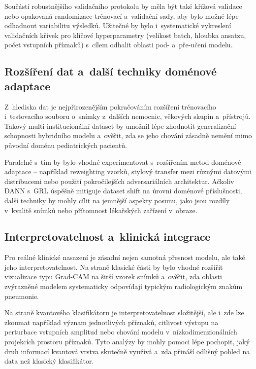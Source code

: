 \documentclass[12pt, a4paper]{report}
\begin{document}
Součástí robustnějšího validačního protokolu by měla být také křížová validace nebo opakovaná randomizace trénovací a~validační sady, aby bylo možné lépe odhadnout variabilitu výsledků. Užitečné by bylo i~systematické vykreslení validačních křivek pro klíčové hyperparametry (velikost batch, hloubka ansatzu, počet vstupních příznaků) s~cílem odhalit oblasti pod- a~pře-učení modelu.

\subsection{Rozšíření dat a~další techniky doménové adaptace}

Z~hlediska dat je nejpřirozenějším pokračováním rozšíření trénovacího i~testovacího souboru o~snímky z~dalších nemocnic, věkových skupin a~přístrojů. Takový multi-institucionální dataset by umožnil lépe zhodnotit generalizační schopnosti hybridního modelu a~ověřit, zda se jeho chování zásadně nemění mimo původní doménu pediatrických pacientů.

Paralelně s~tím by bylo vhodné experimentovat s~rozšířením metod doménové adaptace -- například reweighting vzorků, stylový transfer mezi různými datovými distribucemi nebo použití pokročilejších adversariálních architektur. Ačkoliv DANN s~GRL úspěšně mitiguje dataset shift na úrovni doménové příslušnosti, další techniky by mohly cílit na jemnější aspekty posunu, jako jsou rozdíly v~kvalitě snímků nebo přítomnost lékařských zařízení v~obraze.

\subsection{Interpretovatelnost a~klinická integrace}

Pro reálné klinické nasazení je zásadní nejen samotná přesnost modelu, ale také jeho interpretovatelnost. Na straně klasické části by bylo vhodné rozšířit vizualizace typu Grad-CAM na širší vzorek snímků a~ověřit, zda oblasti zvýrazněné modelem systematicky odpovídají typickým radiologickým znakům pneumonie.

Na straně kvantového klasifikátoru je interpretovatelnost složitější, ale i~zde lze zkoumat například význam jednotlivých příznaků, citlivost výstupu na perturbace vstupních amplitud nebo chování modelu v~nízkodimenzionálních projekcích prostoru příznaků. Tyto analýzy by mohly pomoci lépe pochopit, jaký druh informací kvantová vrstva skutečně využívá a~zda přináší odlišný pohled na data než klasický klasifikátor.
\end{document}
